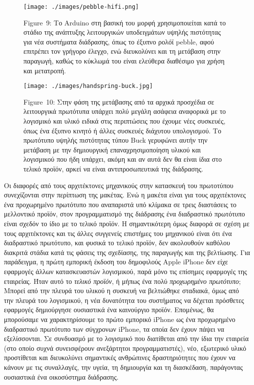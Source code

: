\documentclass[
]{article}
\begin{document}
\leavevmode{}%
\begin{figure}
\hypertarget{fig:pebble-hifi}{%
\centering
\texttt{[image: ./images/pebble-hifi.png]}
\caption{Figure~9: Το Arduino στη βασική του μορφή χρησιμοποιείται κατά
το στάδιο της ανάπτυξης λειτουργικών υποδειγμάτων υψηλής πιστότητας για
νέα συστήματα διάδρασης, όπως το έξυπνο ρολόϊ pebble, αφού επιτρέπει τον
γρήγορο έλεγχο, ενώ διευκολύνει και τη μετάβαση στην παραγωγή, καθώς το
κύκλωμά του είναι ελεύθερα διαθέσιμο για χρήση και
μετατροπή.}\label{fig:pebble-hifi}
}
\end{figure}

\leavevmode{}%
\begin{figure}
\hypertarget{fig:handspring-buck}{%
\centering
\texttt{[image: ./images/handspring-buck.jpg]}
\caption{Figure~10: Στην φάση της μετάβασης από τα αρχικά προσχέδια σε
λειτουργικά πρωτότυπα υπάρχει πολύ μεγάλη ασάφεια αναφορικά με το
λογισμικό και υλικό ειδικά στις περιπτώσεις που έχουμε νέες συσκευές,
όπως ένα έξυπνο κινητό ή άλλες συσκευές διάχυτου υπολογισμού. Το
πρωτότυπο υψηλής πιστότητας τύπου Buck γερυφώνει αυτήν την μετάβαση με
την δημιουργική επαναχρησιμοποίηση υλικού και λογισμικού που ήδη
υπάρχει, ακόμη και αν αυτά δεν θα είναι ίδια στο τελικό προϊόν, αρκεί να
είναι αντιπροσωπευτικά της διάδρασης.}\label{fig:handspring-buck}
}
\end{figure}

Οι διαφορές από τους αρχιτέκτονες μηχανικούς στην κατασκευή του
πρωτοτύπου συνεχίζονται στην περίπτωση της μακέτας. Ενώ η μακέτα είναι
για τους αρχιτέκτονες ένα προχωρημένο πρωτότυπο που αναπαριστά υπό
κλίμακα σε τρεις διαστάσεις το μελλοντικό προϊόν, στον προγραμματισμό
της διάδρασης ένα διαδραστικό πρωτότυπο είναι σχεδόν το ίδιο με το
τελικό προϊόν. Η σημαντικότερη όμως διαφορά σε σχέση με τους
αρχιτέκτονες και τις άλλες συγγενείς επιστήμες του μηχανικού είναι ότι
ένα διαδραστικό πρωτότυπο, και φυσικά το τελικό προϊόν, δεν ακολουθούν
καθόλου διακριτά στάδια κατά τις φάσεις της σχεδίασης, της παραγωγής και
της βελτίωσης. Για παράδειγμα, η πρώτη εμπορική έκδοση του δημοφιλούς
Apple iPhone δεν είχε εφαρμογές άλλων κατασκευαστών λογισμικού, παρά
μόνο τις επίσημες εφαρμογές της εταιρείας. Ήταν αυτό το \emph{τελικό
προϊόν}, ή μήπως ένα πολύ \emph{προχωρημένο πρωτότυπο}; Μπορεί από την
πλευρά του υλικού η συσκευή να βελτιώθηκε σταδιακά, όμως από την πλευρά
του λογισμικού, η νέα δυνατότητα του συστήματος να δέχεται πρόσθετες
εφαρμογές δημιούργησε ουσιαστικά ένα καινούργιο προϊόν. Επομένως, θα
μπορούσαμε να χαρακτηρίσουμε το πρώτο εμπορικό iPhone ως ένα προχωρημένο
διαδραστικό πρωτότυπο των σύγχρονων iPhone, τα οποία δεν έχουν πάψει να
εξελίσσονται. Σε συνδυασμό με το λογισμικό που διατίθεται από την ίδια
την εταιρεία (στο οποίο συχνά συνεισφέρουν ανεξάρτητοι προγραμματιστές),
νέο, εξωτερικό υλικό προστίθεται και διευκολύνει σημαντικές ανθρώπινες
δραστηριότητες που έχουν να κάνουν με τις συναλλαγές, την υγεία, τη
δημιουργία και τη διασκέδαση, παράγοντας ουσιαστικά ένα οικοσύστημα
διάδρασης.
\end{document}
